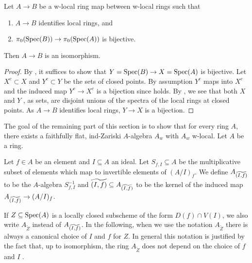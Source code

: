 \begin{lemma}[\stacksproject{097E}]
  \label{thm:isom-of-identifies-local-rings-w-local-isom-pi0}
  Let $A \to B$ be a w-local ring map between w-local rings such that
  \begin{enumerate}
    \item $A \to B$ identifies local rings, and
    \item $\pi_0(\operatorname{Spec} (B)) \to \pi_0(\operatorname{Spec} (A))$ is bijective.
  \end{enumerate}
  Then $A \to B$ is an isomorphism.
\end{lemma}

\begin{proof}
  By , it suffices to show
  that $Y = \operatorname{Spec} (B) \to X = \operatorname{Spec} (A)$ is bijective.
  Let $X^c \subset X$ and $Y^c \subset Y$ be the sets of closed points. By assumption $Y^c$ maps into $X^c$ and the induced map $Y^c \to X^c$ is a bijection since  holds. By , we see that both $X$ and $Y$ , as sets, are disjoint unions of the spectra of the local rings at closed points. As \(A \to B\) identifies local rings, $Y \to X$ is a bijection.
\end{proof}

The goal of the remaining part of this section is to show that for every ring $A$, there exists a faithfully flat, ind-Zariski
$A$-algebra $A_{w}$ with $A_w$ w-local. Let $A$ be a ring.

\begin{definition}
    Let $f \in A$ be an element and $I \subseteq A$ an ideal.
    Let $S_{f, I} \subseteq A$ be the multiplicative subset of elements which map to invertible
    elements of $(A/I)_{f}$.
    We define $A_{\widetilde{(I, f)}}$ to be the $A$-algebra $S_{f, I}^{-1}$
    and $\widetilde{(I, f)} \subseteq A_{\widetilde{(I, f)}}$ to be the kernel of
    the induced map $A_{\widetilde{(I, f)}} \to (A / I)_{f}$.
    \label{def:tilde-locclosed}
    \leanok
\end{definition}

If $Z \subseteq \mathrm{Spec}(A)$ is a locally closed subscheme of the form $D(f) \cap V(I)$, we
also write $A_{\widetilde{Z}}$ instead of $A_{\widetilde{(I, f)}}$.
In the following, when we use the notation $A_{\widetilde{Z}}$ there is always a canonical
choice of $I$ and $f$ for $Z$.
In general this notation is justified by the fact that, up to isomorphism, the ring $A_{\widetilde{Z}}$ does not depend
on the choice of $f$ and $I$ .


